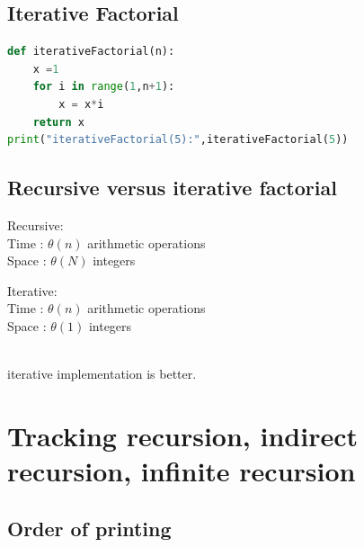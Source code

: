 \documentclass[12pt,oneside]{book}
\begin{document}
\subsection{Iterative Factorial}
{\small\begin{lstlisting}[language=python]
def iterativeFactorial(n):
    x =1 
    for i in range(1,n+1):
        x = x*i 
    return x 
print("iterativeFactorial(5):",iterativeFactorial(5))
\end{lstlisting}}
\subsection{Recursive versus iterative factorial}
\begin{minipage}{0.5\linewidth}
	Recursive:\\
	Time : $\theta(n)$ arithmetic operations \\
	Space : $\theta(N)$ integers
\end{minipage}
\begin{minipage}{0.5\linewidth}
	Iterative:\\
	Time : $\theta(n)$ arithmetic operations \\
	Space : $\theta(1)$ integers
\end{minipage}\\
iterative implementation is better.
\section{Tracking recursion, indirect recursion, infinite recursion}
\subsection{Order of printing}
\end{document}
